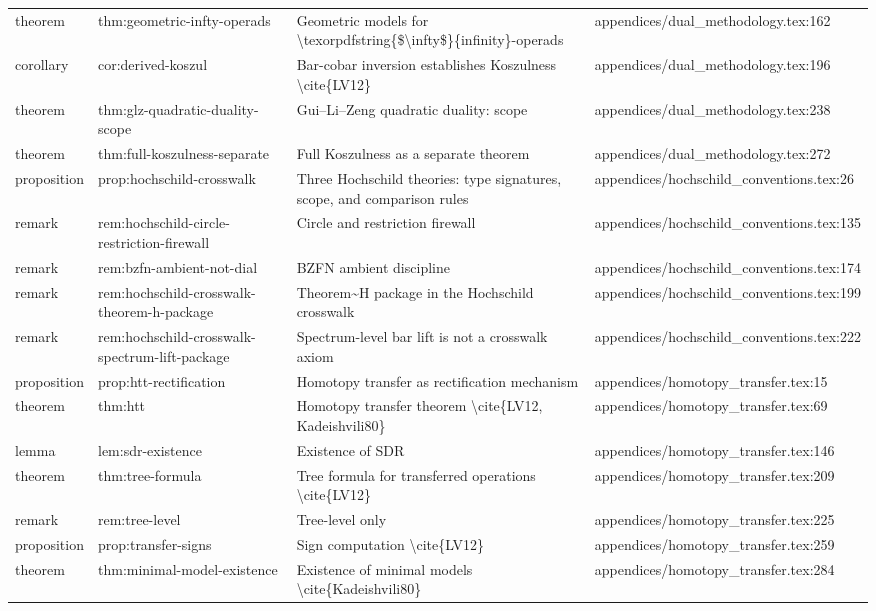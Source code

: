 \documentclass[11pt]{article}
\begin{document}
\begin{longtable}{L{0.10\textwidth}L{0.26\textwidth}L{0.42\textwidth}L{0.22\textwidth}}
theorem & thm:geometric-infty-operads & Geometric models for \textbackslash{}texorpdfstring\{\$\textbackslash{}infty\$\}\{infinity\}-operads & appendices/dual\_methodology.tex:162\\
corollary & cor:derived-koszul & Bar-cobar inversion establishes Koszulness \textbackslash{}cite\{LV12\} & appendices/dual\_methodology.tex:196\\
theorem & thm:glz-quadratic-duality-scope & Gui--Li--Zeng quadratic duality: scope & appendices/dual\_methodology.tex:238\\
theorem & thm:full-koszulness-separate & Full Koszulness as a separate theorem & appendices/dual\_methodology.tex:272\\
proposition & prop:hochschild-crosswalk & Three Hochschild theories: type signatures, scope, and comparison rules & appendices/hochschild\_conventions.tex:26\\
remark & rem:hochschild-circle-restriction-firewall & Circle and restriction firewall & appendices/hochschild\_conventions.tex:135\\
remark & rem:bzfn-ambient-not-dial & BZFN ambient discipline & appendices/hochschild\_conventions.tex:174\\
remark & rem:hochschild-crosswalk-theorem-h-package & Theorem\textasciitilde{}H package in the Hochschild crosswalk & appendices/hochschild\_conventions.tex:199\\
remark & rem:hochschild-crosswalk-spectrum-lift-package & Spectrum-level bar lift is not a crosswalk axiom & appendices/hochschild\_conventions.tex:222\\
proposition & prop:htt-rectification & Homotopy transfer as rectification mechanism & appendices/homotopy\_transfer.tex:15\\
theorem & thm:htt & Homotopy transfer theorem \textbackslash{}cite\{LV12, Kadeishvili80\} & appendices/homotopy\_transfer.tex:69\\
lemma & lem:sdr-existence & Existence of SDR & appendices/homotopy\_transfer.tex:146\\
theorem & thm:tree-formula & Tree formula for transferred operations \textbackslash{}cite\{LV12\} & appendices/homotopy\_transfer.tex:209\\
remark & rem:tree-level & Tree-level only & appendices/homotopy\_transfer.tex:225\\
proposition & prop:transfer-signs & Sign computation \textbackslash{}cite\{LV12\} & appendices/homotopy\_transfer.tex:259\\
theorem & thm:minimal-model-existence & Existence of minimal models \textbackslash{}cite\{Kadeishvili80\} & appendices/homotopy\_transfer.tex:284\\

\end{longtable}
\end{document}
